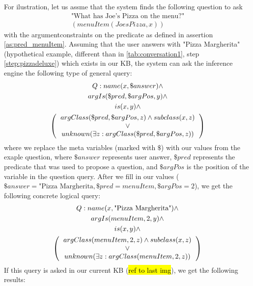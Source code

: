 For ilustration, let us assme that the system finds the following question to
ask 
\begin{equation*}
\begin{gathered}
\text{"What has Joe's Pizza on the menu?"}\\
(menuItem(JoesPizza,x))
\end{gathered}
\end{equation*}
with the argumentconstraints on the predicate as defined in assertion 
\ref{as:pred_menuItem}. Assuming that the user answers with "Pizza Margherita"
(hypothetical example, different than in \autoref{tab:conversation1}, step
\ref{step:pizzadeluxe}) which exists in our KB, the system can ask the inference
engine the following type of general query:
\begin{equation}
\begin{gathered}
    Q:name(x,\$answer)\land \\ %
    argIs(\$pred,\$argPos,y)\land \\ %
    is(x,y)\land \\
    \left(
    \begin{tabular}{c}
        $argClass(\$pred,\$argPos,z) \land  subclass(x,z)$\\
        $\lor$\\
        $unknown(\exists z:argClass(\$pred,\$argPos,z))$ \\
    \end{tabular}
    \right)
\end{gathered}
\end{equation}
where we replace the meta variables (marked with $\$$) with our values from 
the exaple question, where $\$answer$ represents user answer, $\$pred$ 
represents the predicate that was used to propose a question, and 
$\$argPos$ is the position of the variable in the question query. After we
fill in our values ($\$answer=\text{"Pizza Margherita}, \$pred=menuItem, 
\$argPos=2$), we get the following concrete logical query:
\begin{equation}\label{q:constraintQuery}
\begin{gathered}
   Q:name(x,\text{"Pizza Margherita"})\land \\ 
    argIs(menuItem,2,y)\land \\
    is(x,y)\land \\
    \left(
    \begin{tabular}{c}
        $argClass(menuItem,2,z) \land  subclass(x,z)$\\
        $\lor$\\
        $unknown(\exists z: argClass(menuItem,2,z))$ \\
    \end{tabular}
    \right)
\end{gathered}
\end{equation}
If this query is asked in our current KB (\hl{ref to last img}), we get the 
following results:

